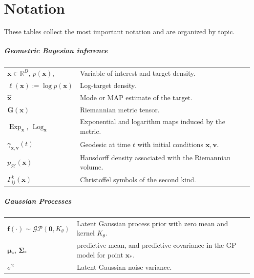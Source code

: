 \chapter*{Notation}
These tables collect the most important notation and are organized by topic. 

\paragraph{Geometric Bayesian inference}
\begin{center}
\renewcommand{\arraystretch}{1.15}
\begin{tabular}{@{}p{}p{}@{}}
$\boldsymbol{x}\in\mathbb{R}^{D}$, $p(\boldsymbol{x})$,  & Variable of interest and target density. \\
$\ell(\boldsymbol{x}):=\log p(\boldsymbol{x})$ & Log-target density.\\
$\hat{\boldsymbol{x}}$ & Mode or MAP estimate of the target. \\
$\mathbf{G}(\boldsymbol{x})$ & Riemannian metric tensor. \\
$\operatorname{Exp}_{\boldsymbol{x}}$, $\operatorname{Log}_{\boldsymbol{x}}$ & Exponential and logarithm maps induced by the metric. \\
$\gamma_{\boldsymbol{x}, \boldsymbol{v}}(t)$ & Geodesic at time $t$ with initial conditions $\boldsymbol{x}, \boldsymbol{v}$. \\
$p_{\mathcal{H}}(\boldsymbol{x})$ & Hausdorff density associated with the Riemannian volume. \\
$\Gamma^k_{ij}(\boldsymbol{x})$ & Christoffel symbols of the second kind. \\
\end{tabular}
\end{center}

\paragraph{Gaussian Processes}
\begin{center}
\renewcommand{\arraystretch}{1.15}
\begin{tabular}{@{}p{}p{}@{}}
$\mathbf{f}(\cdot)\sim\mathcal{GP}(\mathbf{0},K_{\theta})$ & Latent Gaussian process prior with zero mean and kernel $K_{\theta}$. \\
$\boldsymbol{\mu}_*$, $\boldsymbol{\Sigma}_*$ &  predictive mean, and predictive covariance in the GP model for point $\boldsymbol{x}_*$. \\
$\sigma^2$ & Latent Gaussian noise variance. \\
\end{tabular}
\end{center}

